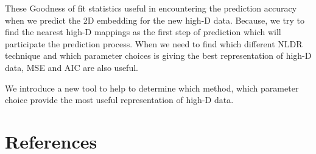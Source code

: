 \documentclass[
  12pt]{article}
\begin{document}
These Goodness of fit statistics useful in encountering the prediction
accuracy when we predict the 2D embedding for the new high-D data.
Because, we try to find the nearest high-D mappings as the first step of
prediction which will participate the prediction process. When we need
to find which different NLDR technique and which parameter choices is
giving the best representation of high-D data, MSE and AIC are also
useful.

We introduce a new tool to help to determine which method, which
parameter choice provide the most useful representation of high-D data.

\hypertarget{references}{%
\section*{References}\label{references}}

\renewcommand{\bibsection}{}


\newpage{}
\end{document}
